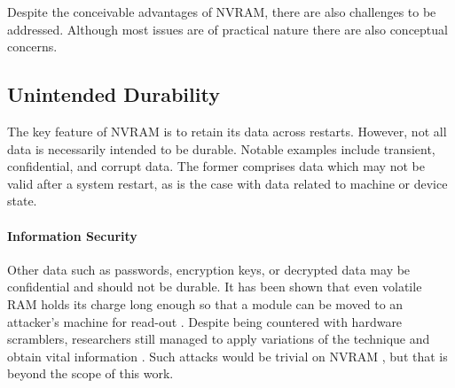 Despite the conceivable advantages of \ac{NVRAM}, there are also challenges to
be addressed. Although most issues are of practical nature there are also
conceptual concerns.

\subsection{Unintended Durability}

The key feature of \ac{NVRAM} is to retain its data across restarts. However,
not all data is necessarily intended to be durable. Notable examples include
transient, confidential, and corrupt data. The former comprises data which may
not be valid after a system restart, as is the case with data related to machine
or device state.

\paragraph{Information Security}

Other data such as passwords, encryption keys, or decrypted data may be
confidential and should not be durable. It has been shown that even volatile
\ac{RAM} holds its charge long enough so that a module can be moved to an
attacker's machine for read-out \cite{halderman2008lest}. Despite being
countered with hardware scramblers, researchers still managed to apply
variations of the technique and obtain vital information
\cite{yitbarek2017cold}. Such attacks would be trivial on \ac{NVRAM}
\cite{bailey2011operating}, but that is beyond the scope of this work.


